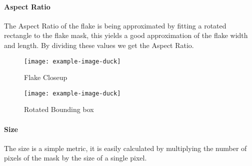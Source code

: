 \paragraph{Aspect Ratio}
The Aspect Ratio of the flake is being approximated by fitting a rotated rectangle to the flake mask, this yields a good approximation of the flake width and length. By dividing these values we get the Aspect Ratio.
\begin{figure}[h!]
\centering
\begin{minipage}{.45\textwidth}
  \centering
  \texttt{[image: example-image-duck]}
  \caption{Flake Closeup}
\end{minipage}
\begin{minipage}{.45\textwidth}

  \centering
  \texttt{[image: example-image-duck]}
    \caption{Rotated Bounding box}
\end{minipage}
\end{figure}

\paragraph{Size}
The size is a simple metric, it is easily calculated by multiplying the number of pixels of the mask by the size of a single pixel.


